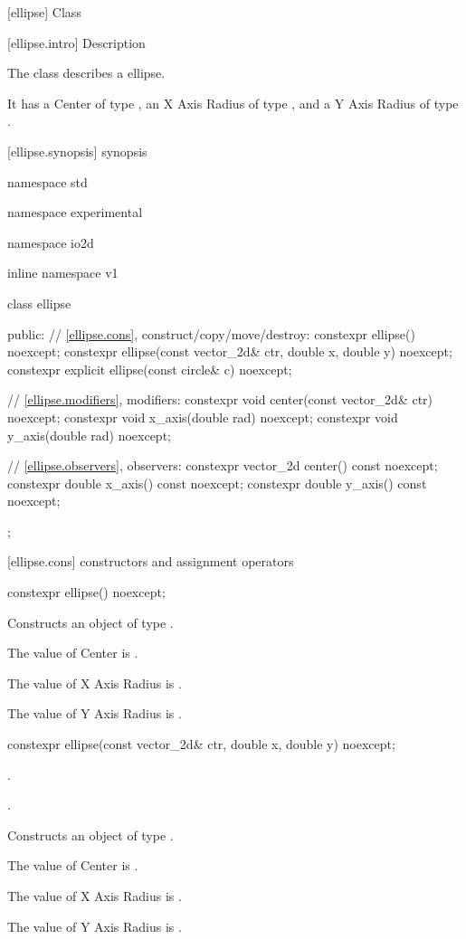  [ellipse] {Class }

 [ellipse.intro] { Description}

\pnum
{}
The class  describes a ellipse.

\pnum
It has a Center of type , an X Axis Radius of type , and a Y Axis Radius of type .

 [ellipse.synopsis] { synopsis}

\begin{codeblock}
namespace std { namespace experimental { namespace io2d { inline namespace v1 {
  class ellipse {
  public:
    // \ref{ellipse.cons}, construct/copy/move/destroy:
    constexpr ellipse() noexcept;
    constexpr ellipse(const vector_2d& ctr, double x, double y) noexcept;
    constexpr explicit ellipse(const circle& c) noexcept;

    // \ref{ellipse.modifiers}, modifiers:
    constexpr void center(const vector_2d& ctr) noexcept;
    constexpr void x_axis(double rad) noexcept;
    constexpr void y_axis(double rad) noexcept;
    
    // \ref{ellipse.observers}, observers:
    constexpr vector_2d center() const noexcept;
    constexpr double x_axis() const noexcept;
    constexpr double y_axis() const noexcept;
  };
} } } }
\end{codeblock}

 [ellipse.cons] { constructors and assignment operators}

\begin{itemdecl}
constexpr ellipse() noexcept;
\end{itemdecl}
\begin{itemdescr}
\pnum
\effects
Constructs an object of type .

\pnum
The value of Center is .

\pnum
The value of X Axis Radius is .

\pnum
The value of Y Axis Radius is .
\end{itemdescr}

\begin{itemdecl}
constexpr ellipse(const vector_2d& ctr, double x, double y) noexcept;
\end{itemdecl}
\begin{itemdescr}
\pnum
\preconditions
{}.

\pnum
{}.

\pnum
\effects
Constructs an object of type .

\pnum
The value of Center is .

\pnum
The value of X Axis Radius is .

\pnum
The value of Y Axis Radius is .
\end{itemdescr}

